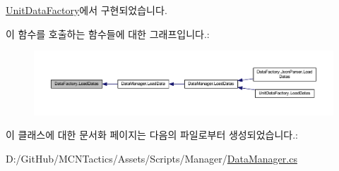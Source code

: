 \hyperlink{class_unit_data_factory_a048e5ca3d28d88eddf55537a4930f1df}{Unit\+Data\+Factory}에서 구현되었습니다.



이 함수를 호출하는 함수들에 대한 그래프입니다.\+:
\nopagebreak
\begin{figure}[H]
\begin{center}
\leavevmode
\includegraphics[width=350pt]{class_data_factory_a8ed29ae4a917c15aa824bb7f56418cbf_icgraph}
\end{center}
\end{figure}




이 클래스에 대한 문서화 페이지는 다음의 파일로부터 생성되었습니다.\+:\begin{DoxyCompactItemize}
\item 
D\+:/\+Git\+Hub/\+M\+C\+N\+Tactics/\+Assets/\+Scripts/\+Manager/\hyperlink{_data_manager_8cs}{Data\+Manager.\+cs}\end{DoxyCompactItemize}
